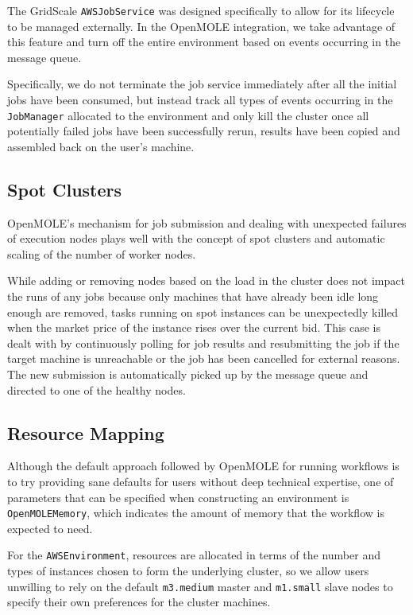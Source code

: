The GridScale \verb|AWSJobService| was designed specifically to allow for its lifecycle to be managed externally. In the OpenMOLE integration, we take advantage of this feature and turn off the entire environment based on events occurring in the message queue.

Specifically, we do not terminate the job service immediately after all the initial jobs have been consumed, but instead track all types of events occurring in the \verb|JobManager| allocated to the environment and only kill the cluster once all potentially failed jobs have been successfully rerun, results have been copied and assembled back on the user's machine.

\subsection{Spot Clusters}

OpenMOLE's mechanism for job submission and dealing with unexpected failures of execution nodes plays well with the concept of spot clusters and automatic scaling of the number of worker nodes.

While adding or removing nodes based on the load in the cluster does not impact the runs of any jobs because only machines that have already been idle long enough are removed, tasks running on spot instances can be unexpectedly killed when the market price of the instance rises over the current bid. This case is dealt with by continuously polling for job results and resubmitting the job if the target machine is unreachable or the job has been cancelled for external reasons. The new submission is automatically picked up by the message queue and directed to one of the healthy nodes.

\subsection{Resource Mapping}

Although the default approach followed by OpenMOLE for running workflows is to try providing sane defaults for users without deep technical expertise, one of parameters that can be specified when constructing an environment is \verb|OpenMOLEMemory|, which indicates the amount of memory that the workflow is expected to need.

For the \verb|AWSEnvironment|, resources are allocated in terms of the number and types of instances chosen to form the underlying cluster, so we allow users unwilling to rely on the default \verb|m3.medium| master and \verb|m1.small| slave nodes to specify their own preferences for the cluster machines.

